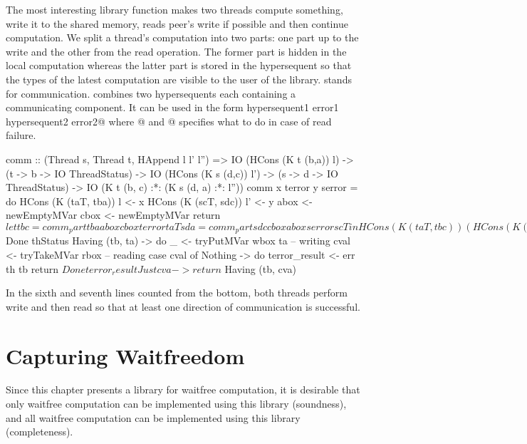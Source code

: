 The most interesting
library function \verb@comm@ makes two threads compute something, write it to
the shared memory, reads peer's write if possible and then continue
computation. We split a thread's computation into two parts: one part
up to the write and the other from the read operation. The former part is
hidden in the local computation whereas the latter part is stored in the
hypersequent so that the types of the latest computation are visible to
the user of the library.
\verb@comm@ stands for communication.  \verb@comm@ combines two
hypersequents each containing
a communicating component.
It can be used in the form
\verb@comm hypersequent1 error1 hypersequent2 error2@ where @ and
@ specifies what to do in case of read failure.
\begin{code}
comm :: (Thread s, Thread t, HAppend l l' l'') =>
        IO (HCons (K t (b,a)) l)
         -> (t -> b -> IO ThreadStatus)
         -> IO (HCons (K s (d,c)) l')
         -> (s -> d -> IO ThreadStatus)
         -> IO (K t (b, c) :*: (K s (d, a) :*: l''))
comm x terror y serror = do
  HCons (K (taT, tba)) l <- x
  HCons (K (scT, sdc)) l' <- y
  abox <- newEmptyMVar
  cbox <- newEmptyMVar
  return $ let
      tbc = comm_part tba abox cbox terror taT
      sda = comm_part sdc cbox abox serror scT
    in
    HCons (K (taT, tbc))
      (HCons (K (scT, sda)) (hAppend l l'))
    where
      comm_part tba wbox rbox err th = do
            maybeba <- tba
            case maybeba of
              Done thStatus -> return $ Done thStatus
              Having (tb, ta) -> do
                _ <- tryPutMVar wbox ta    -- writing
                cval <- tryTakeMVar rbox   -- reading
                case cval of
                  Nothing -> do
                    terror_result <- err th tb
                    return $ Done terror_result
                  Just cva -> return $ Having (tb, cva)
\end{code}
In the sixth and seventh lines counted from the bottom, both threads
perform write and then read so that at least one
direction of communication is successful.

\section{Capturing Waitfreedom}

Since this chapter presents a library for waitfree computation, it is
desirable that only waitfree computation can be implemented using this
library (soundness), and all waitfree computation can be implemented
using this library (completeness).

